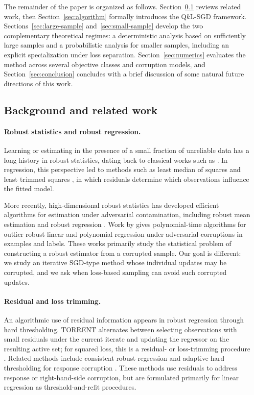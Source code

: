 \documentclass[11pt]{article}
\begin{document}
The remainder of the paper is organized as follows. Section~\ref{sec:related-work} reviews related work, then Section~\ref{sec:algorithm} formally introduces the Q\(k\)L-SGD framework. Sections~\ref{sec:large-sample} and~\ref{sec:small-sample} develop the two complementary theoretical regimes: a deterministic analysis based on sufficiently large samples and a probabilistic analysis for smaller samples, including an explicit specialization under loss separation. Section~\ref{sec:numerics} evaluates the method across several objective classes and corruption models, and Section~\ref{sec:conclusion} concludes with a brief discussion of some natural future directions of this work.


\subsection{Background and related work} \label{sec:related-work}

\paragraph{Robust statistics and robust regression.}
Learning or estimating in the presence of a small fraction of unreliable data
has a long history in robust statistics, dating back to classical works such
as \citep{tukey1960survey, huber1992robust}. In regression, this
perspective led to methods such as least median of squares and least trimmed
squares \citep{rousseeuw1984least,vivsek2006least}, in which residuals
determine which observations influence the fitted model.

More recently, high-dimensional robust statistics has developed efficient
algorithms for estimation under adversarial contamination, including robust
mean estimation and robust regression
\citep{awasthi2014power,lai2016agnostic,charikar2017learning,
diakonikolas2019robust}. Work by \citet{klivans2018efficient} gives
polynomial-time algorithms for outlier-robust linear and polynomial regression
under adversarial corruptions in examples and labels. These works primarily
study the statistical problem of constructing a robust estimator from a
corrupted sample. Our goal is different: we study an iterative
SGD-type method whose individual updates may be corrupted, and we ask when
loss-based sampling can avoid such corrupted updates.


\paragraph{Residual and loss trimming.}
An algorithmic use of residual information appears in robust regression
through hard thresholding. TORRENT alternates between selecting observations
with small residuals under the current iterate and updating the regressor on
the resulting active set; for squared loss, this is a residual- or loss-trimming
procedure \citep{bhatia2015robust}. Related methods include consistent robust
regression and adaptive hard thresholding for response corruption
\citep{bhatia2017consistent,suggala2019adaptive}. These methods use residuals
to address response or right-hand-side corruption, but are formulated primarily
for linear regression as threshold-and-refit procedures.
\end{document}
